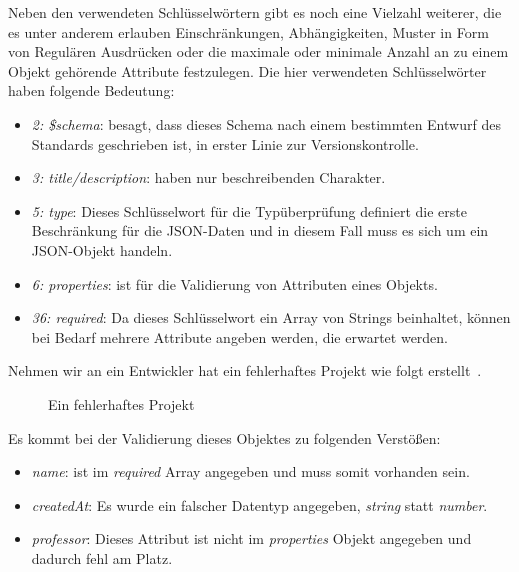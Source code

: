 Neben den verwendeten Schlüsselwörtern gibt es noch eine Vielzahl weiterer, die es unter anderem erlauben Einschränkungen, Abhängigkeiten,
Muster in Form von Regulären Ausdrücken oder die maximale oder minimale Anzahl an zu einem Objekt gehörende Attribute festzulegen.
Die hier verwendeten Schlüsselwörter haben folgende Bedeutung:

\begin{itemize}
    \label{basics:jsonschema:items}
    \setlength\itemsep{-1em}
    \item \emph{2: \$schema}: besagt, dass dieses Schema nach einem bestimmten Entwurf des Standards geschrieben ist, in erster Linie zur Versionskontrolle.
    \item \emph{3: title/description}: haben nur beschreibenden Charakter.
    \item \emph{5: type}: Dieses Schlüsselwort für die Typüberprüfung definiert die erste Beschränkung für die JSON-Daten und in diesem Fall muss es sich um ein JSON-Objekt handeln.
    \item \emph{6: properties}: ist für die Validierung von Attributen eines Objekts.
    \item \emph{36: required}: Da dieses Schlüsselwort ein Array von Strings beinhaltet, können bei Bedarf mehrere Attribute angeben werden, die erwartet werden.
\end{itemize}

Nehmen wir an ein Entwickler hat ein fehlerhaftes Projekt wie folgt erstellt~.

\begin{figure}[hb!]
    
    \caption{Ein fehlerhaftes Projekt}
    \label{fig:basics:jsonschema:3}
\end{figure}

Es kommt bei der Validierung dieses Objektes zu folgenden Verstößen:

\begin{itemize}
    \setlength\itemsep{-1em}
    \item \emph{name}: ist im \emph{required} Array angegeben und muss somit vorhanden sein.
    \item \emph{createdAt}: Es wurde ein falscher Datentyp angegeben, \emph{string} statt \emph{number}.
    \item \emph{professor}: Dieses Attribut ist nicht im \emph{properties} Objekt angegeben und dadurch fehl am Platz.
\end{itemize}

